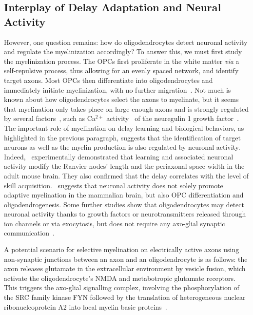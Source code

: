 \documentclass[brainsci, %
               review,accept,pdftex,moreauthors
               ]{Definitions/mdpi}
\begin{document}
\subsection{Interplay of Delay Adaptation and Neural Activity}
However, one question remains: how do oligodendrocytes detect neuronal activity and regulate the myelinization accordingly? To answer this, we must first study the myelinization process. The OPCs first proliferate in the white matter \textit{via} a self-repulsive process, thus allowing for an evenly spaced network, and identify target axons. Most OPCs then differentiate into oligodendrocytes and immediately initiate myelinization, with no further migration~\citep{simons_oligodendrocytes_2016}. Not much is known about how oligodendrocytes select the axons to myelinate, but it seems that myelination only takes place on large enough axons and is strongly regulated by several factors~\citep{kuhn_oligodendrocytes_2019}, such as Ca$^{2+}$ activity~\citep{baraban_ca2_2018} of the neuregulin 1 growth factor~\citep{nave_axonal_2006}. The important role of myelination on delay learning and biological behaviors, as highlighted in the previous paragraph, suggests that the identification of target neurons as well as the myelin production is also regulated by neuronal activity. Indeed,~\citet{cullen_periaxonal_2021} experimentally demonstrated that learning and associated neuronal activity modify the Ranvier nodes' length and the periaxonal space width in the adult mouse brain. They also confirmed that the delay correlates with the level of skill acquisition.~\citet{gibson_neuronal_2014} suggests that neuronal activity does not solely promote adaptive myelination in the mammalian brain, but also OPC differentiation and oligodendrogenesis. Some further studies show that oligodendrocytes may detect neuronal activity thanks to growth factors or neurotransmitters released through ion channels or {via} exocytosis, but does not require any axo-glial synaptic communication~\citep{fields_new_2015}. 

A potential scenario for selective myelination on electrically active axons using non-synaptic junctions between an axon and an oligodendrocyte is as follows: the axon releases glutamate in the extracellular environment by vesicle fusion, which activate the oligodendrocyte's NMDA and metabotropic glutamate receptors. This triggers the axo-glial signalling complex, involving the phosphorylation of the SRC family kinase FYN followed by the translation of heterogeneous nuclear ribonucleoprotein A2 into local myelin basic proteins~\citep{fields_new_2015}.
\end{document}
